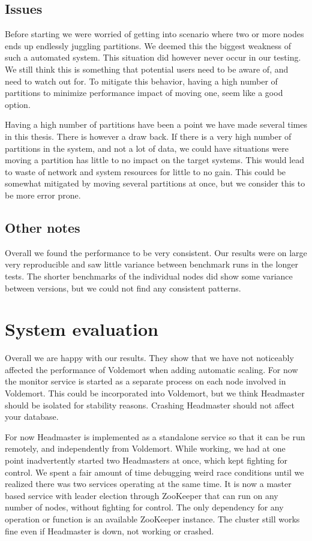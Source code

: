 \subsection{Issues}

Before starting we were worried of getting into scenario where two or more nodes ends up endlessly juggling partitions. We deemed this the biggest weakness of such a automated system. This situation did however never occur in our testing. We still think this is something that potential users need to be aware of, and need to watch out for. To mitigate this behavior, having a high number of partitions to minimize performance impact of moving one, seem like a good option.

Having a high number of partitions have been a point we have made several times in this thesis. There is however a draw back. If there is a very high number of partitions in the system, and not a lot of data, we could have situations were moving a partition has little to no impact on the target systems. This would lead to waste of network and system resources for little to no gain. This could be somewhat mitigated by moving several partitions at once, but we consider this to be more error prone. 


\subsection{Other notes}
Overall we found the performance to be very consistent. Our results were on large very reproducible and saw little variance between benchmark runs in the longer tests. The shorter benchmarks of the individual nodes did show some variance between versions, but we could not find any consistent patterns.  


\section{System evaluation}
\label{eval:discussion}
Overall we are happy with our results. They show that we have not noticeably affected the performance of Voldemort when adding automatic scaling. For now the monitor service is started as a separate process on each node involved in Voldemort. This could be incorporated into Voldemort, but we think Headmaster should be isolated for stability reasons. Crashing Headmaster should not affect your database.

For now Headmaster is implemented as a standalone service so that it can be run remotely, and independently from Voldemort. 
While working, we had at one point inadvertently started two Headmasters at once, which kept fighting for control.
We spent a fair amount of time debugging weird race conditions until we realized there was two services operating at the same time.
It is now a master based service with leader election through ZooKeeper that can run on any number of nodes, without fighting for control. The only dependency for any operation or function is an available ZooKeeper instance. The cluster still works fine even if Headmaster is down, not working or crashed.

